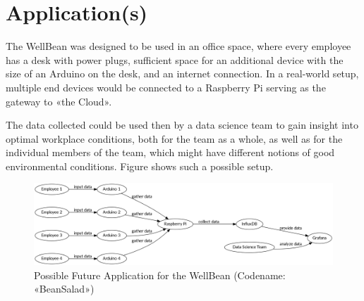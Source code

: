 \section{Application(s)}

The WellBean was designed to be used in an office space, where every employee has a desk with power plugs, sufficient space for an additional device with the size of an Arduino on the desk, and an internet connection. In a real-world setup, multiple end devices would be connected to a Raspberry Pi serving as the gateway to «the Cloud».

The data collected could be used then by a data science team to gain insight into optimal workplace conditions, both for the team as a whole, as well as for the individual members of the team, which might have different notions of good environmental conditions. Figure  shows such a possible setup.

\begin{figure}
	\centering
	\includegraphics[width=\linewidth]{applications.png}
	\caption{Possible Future Application for the WellBean (Codename: «BeanSalad»)}
	\label{fig:beansalad}
\end{figure}
